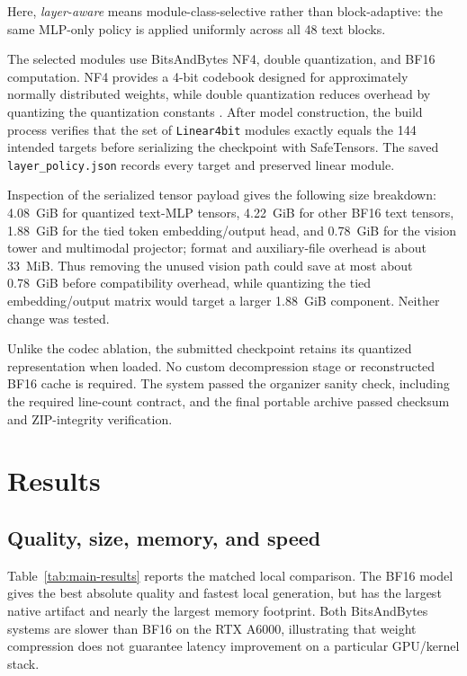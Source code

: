 \documentclass[11pt]{article}
\begin{document}
Here, \emph{layer-aware} means module-class-selective rather than block-adaptive: the same MLP-only policy is applied uniformly across all 48 text blocks.

The selected modules use BitsAndBytes NF4, double quantization, and BF16 computation. NF4 provides a 4-bit codebook designed for approximately normally distributed weights, while double quantization reduces overhead by quantizing the quantization constants \citep{dettmers-etal-2023-qlora}. After model construction, the build process verifies that the set of \texttt{Linear4bit} modules exactly equals the 144 intended targets before serializing the checkpoint with SafeTensors. The saved \texttt{layer\_policy.json} records every target and preserved linear module.

Inspection of the serialized tensor payload gives the following size breakdown: 4.08~GiB for quantized text-MLP tensors, 4.22~GiB for other BF16 text tensors, 1.88~GiB for the tied token embedding/output head, and 0.78~GiB for the vision tower and multimodal projector; format and auxiliary-file overhead is about 33~MiB. Thus removing the unused vision path could save at most about 0.78~GiB before compatibility overhead, while quantizing the tied embedding/output matrix would target a larger 1.88~GiB component. Neither change was tested.

Unlike the codec ablation, the submitted checkpoint retains its quantized representation when loaded. No custom decompression stage or reconstructed BF16 cache is required. The system passed the organizer sanity check, including the required line-count contract, and the final portable archive passed checksum and ZIP-integrity verification.

\section{Results}

\subsection{Quality, size, memory, and speed}

Table~\ref{tab:main-results} reports the matched local comparison. The BF16 model gives the best absolute quality and fastest local generation, but has the largest native artifact and nearly the largest memory footprint. Both BitsAndBytes systems are slower than BF16 on the RTX A6000, illustrating that weight compression does not guarantee latency improvement on a particular GPU/kernel stack.
\end{document}
